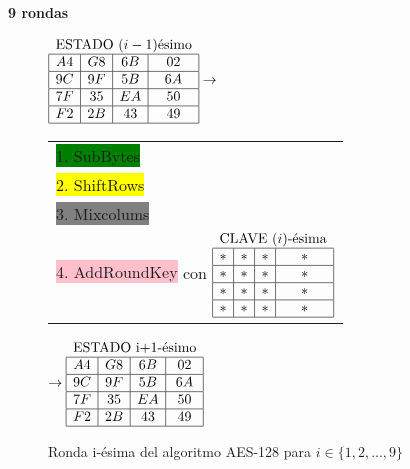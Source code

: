 \begin{center}{\bf 9 rondas}\end{center}
\begin{figure}[!ht]
\begin{figurebox}
\begin{center}
$\begin{array}{|c|c|c|c|}
\multicolumn{4}{c}{\text{ESTADO $(i-1)$ésimo}}\\\hline
A4 & G8 & 6B & 02\\\hline
9C & 9F & 5B & 6A\\\hline
7F & 35 & EA & 50\\\hline
F2 & 2B & 43 & 49\\\hline
\end{array}\rightarrow$
\begin{tabular}{l}
\\
\colorbox{green}{1. SubBytes}\\
\colorbox{yellow}{2. ShiftRows}\\
\colorbox{gray}{3. Mixcolums } \\
\colorbox{pink}{4. AddRoundKey} con
\tiny{
$\begin{array}{|c|c|c|c|}
\multicolumn{4}{c}{\text{CLAVE $(i)$-ésima}}\\\hline
* & * & * & *\\\hline
* & * & * & *\\\hline
* & * & * & *\\\hline
* & * & * & *\\\hline
\end{array}$
}
\\
\end{tabular} $\rightarrow
\begin{array}{|c|c|c|c|}
\multicolumn{4}{c}{\text{ESTADO i+1-ésimo}}\\\hline
A4 & G8 & 6B & 02\\\hline
9C & 9F & 5B & 6A\\\hline
7F & 35 & EA & 50\\\hline
F2 & 2B & 43 & 49\\\hline
\end{array}
$
\end{center}\caption{Ronda i-ésima del algoritmo AES-128 para $i\in\{1,2,...,9\}$}\label{fig:inputaes2}
\end{figurebox}
\end{figure}

